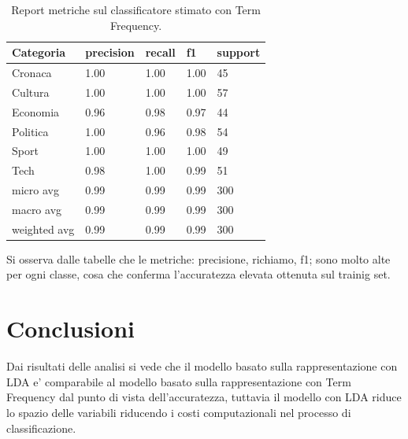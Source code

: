 \documentclass[runningheads]{llncs}
\begin{document}
\begin{table}[]
\centering
\begin{tabular}{lllll}
\hline
Categoria    & precision & recall & f1   & support \\ \hline
Cronaca     & 1.00   &   1.00    &  1.00 & 45      \\
Cultura      & 1.00      & 1.00   & 1.00 & 57      \\
Economia     & 0.96      & 0.98   & 0.97 & 44      \\
Politica     & 1.00      & 0.96   & 0.98 & 54      \\
Sport        & 1.00      & 1.00   & 1.00 & 49      \\
Tech         & 0.98      & 1.00   & 0.99 & 51      \\ \hline
micro avg    & 0.99      & 0.99   & 0.99 & 300     \\ \hline
macro avg    & 0.99      & 0.99   & 0.99 & 300     \\ \hline
weighted avg & 0.99      & 0.99   & 0.99 & 300    \\  \hline
\end{tabular}
    \caption{Report metriche sul classificatore stimato con Term Frequency.}%

\end{table}


Si osserva dalle tabelle che le metriche: precisione, richiamo, f1; sono molto alte per ogni classe, cosa che conferma l'accuratezza elevata ottenuta sul trainig set.


\section{Conclusioni}

Dai risultati delle analisi si vede che il modello basato sulla rappresentazione con LDA e' comparabile al modello basato sulla rappresentazione con Term Frequency dal punto di vista dell'accuratezza, tuttavia il modello con LDA riduce lo spazio delle variabili riducendo i costi computazionali nel processo di classificazione.

%
%
%
\end{document}

